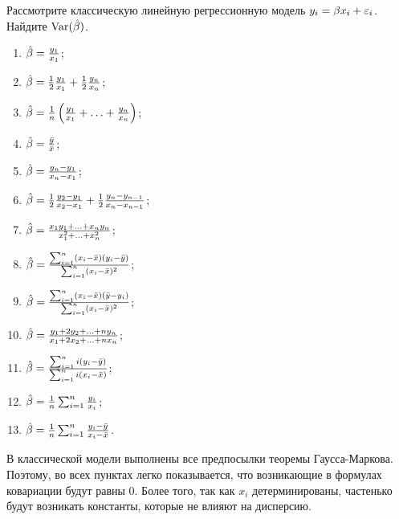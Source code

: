 \begin{problem}
Рассмотрите классическую линейную регрессионную модель $y_i = \beta x_i + \varepsilon_i$. Найдите $\operatorname{Var}(\hat{\beta})$.

\begin{enumerate}
\item $\hat{\beta} = \frac{y_1}{x_1}$;
\item $\hat{\beta} = \frac{1}{2} \frac{y_1}{x_1} + \frac{1}{2} \frac{y_n}{x_n}$;
\item $\hat{\beta} = \frac{1}{n} \left( \frac{y_1}{x_1} + \ldots + \frac{y_n}{x_n} \right)$;
\item $\hat{\beta} = \frac{\bar{y}}{\bar{x}}$;
\item $\hat{\beta} = \frac{y_n - y_1}{x_n - x_1}$;
\item $\hat{\beta} = \frac{1}{2} \frac{y_2 - y_1}{x_2 - x_1} + \frac{1}{2} \frac{y_n - y_{n-1}}{x_n - x_{n-1}}$;
\item $\hat{\beta} = \frac{x_1 y_1 + \ldots + x_n y_n}{x_1^2 + \ldots + x_n^2}$;
\item $\hat{\beta} = \frac{\sum_{i=1}^n (x_i - \bar{x})(y_i - \bar{y})}{\sum_{i=1}^n (x_i - \bar{x})^2}$;
\item $\hat{\beta} = \frac{\sum_{i=1}^n (x_i - \bar{x})(\bar{y} - y_i)}{\sum_{i=1}^n (x_i - \bar{x})^2}$;
\item $\hat{\beta} = \frac{y_1 + 2 y_2 + \ldots + n y_n}{x_1 + 2 x_2 + \ldots + n x_n}$;
\item $\hat{\beta} = \frac{\sum_{i=1}^n i(y_i - \bar{y})}{\sum_{i=1}^n i(x_i - \bar{x})}$;
\item $\hat{\beta} = \frac{1}{n} \sum_{i=1}^n \frac{y_i}{x_i}$;
\item $\hat{\beta} = \frac{1}{n} \sum_{i=1}^n \frac{y_i - \bar{y}}{x_i - \bar{x}}$.
\end{enumerate}


\begin{sol}
В классической модели выполнены все предпосылки теоремы Гаусса-Маркова. Поэтому, во всех пунктах легко показывается, что возникающие в формулах ковариации будут равны 0. Более того, так как $x_i$ детерминированы, частенько будут возникать константы, которые не влияют на дисперсию.


\end{sol}
\end{problem}
